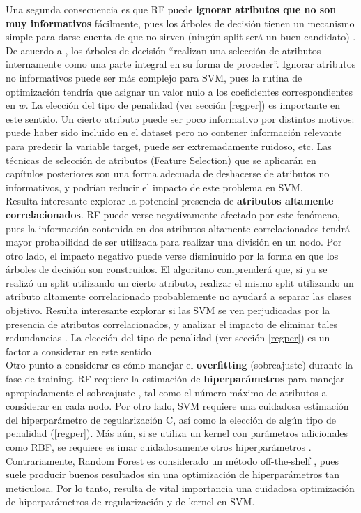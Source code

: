 Una segunda consecuencia es que RF puede \textbf{ignorar atributos que no son muy informativos} fácilmente, pues los árboles de decisión tienen un mecanismo simple para darse cuenta de que no sirven (ningún split será un buen candidato) \cite{statisticallearning}. De acuerdo a \cite{statisticallearning}, los árboles de decisión ``realizan una selección de atributos internamente como una parte integral en su forma de proceder''. Ignorar atributos no informativos puede ser más complejo para SVM, pues la rutina de optimización tendría que asignar un valor nulo a los coeficientes correspondientes en $w$. La elección del tipo de penalidad (ver sección \ref{regper}) es importante en este sentido. Un cierto atributo puede ser poco informativo por distintos motivos: puede haber sido incluido en el dataset pero no contener información relevante para predecir la variable target, puede ser extremadamente ruidoso, etc.  Las técnicas de selección de atributos  (Feature Selection) que se aplicarán en capítulos posteriores son una forma adecuada de deshacerse de atributos no informativos, y podrían reducir el impacto de este problema en SVM. \\

Resulta interesante explorar la potencial presencia de \textbf{atributos altamente correlacionados}. RF puede verse negativamente afectado por este fenómeno, pues la información contenida en dos atributos altamente correlacionados tendrá mayor probabilidad de ser utilizada para realizar una división en un nodo. Por otro lado, el impacto negativo puede verse disminuido por la forma en que los árboles de decisión son construidos. El algoritmo comprenderá que, si ya se realizó un split utilizando un cierto atributo, realizar el mismo split utilizando un atributo altamente correlacionado probablemente no ayudará a separar las clases objetivo. Resulta interesante explorar si las SVM se ven perjudicadas por la presencia de atributos correlacionados, y analizar el impacto de eliminar tales redundancias \cite{rf_collinearity}. La elección del tipo de penalidad (ver sección \ref{regper}) es un factor a considerar en este sentido\\

Otro punto a considerar es cómo manejar el \textbf{overfitting} (sobreajuste) durante la fase de training. RF requiere la estimación de \textbf{hiperparámetros}  para manejar apropiadamente el sobreajuste \cite{louppe2015understanding}, tal como el número máximo de atributos a considerar en cada nodo. Por otro lado, SVM requiere una cuidadosa estimación del hiperparámetro de regularización C, así como la elección de algún tipo de penalidad (\ref{regper}). Más aún, si se utiliza un kernel con parámetros adicionales como RBF, se requiere es
imar cuidadosamente otros hiperparámetros \cite{svm_practical}. Contrariamente, Random Forest es considerado un método off-the-shelf \cite{offshelf}, pues suele producir buenos resultados sin una optimización de hiperparámetros tan meticulosa. Por lo tanto, resulta de vital importancia una cuidadosa optimización de hiperparámetros de regularización y de kernel en SVM. \\

